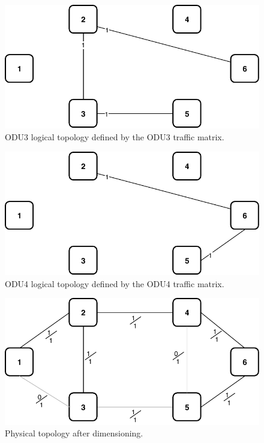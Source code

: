 \begin{figure}[h!]
\centering
\includegraphics[width=12cm]{sdf/ilp/opaque_survivability/figures/logical_topology_ODU3_low}
\caption{ODU3 logical topology defined by the ODU3 traffic matrix.}
\label{logical_ODU3_low}
\end{figure}

\begin{figure}[h!]
\centering
\includegraphics[width=12cm]{sdf/ilp/opaque_survivability/figures/logical_topology_ODU4_low}
\caption{ODU4 logical topology defined by the ODU4 traffic matrix.}
\label{logical_ODU4_low}
\end{figure}

\begin{figure}[h!]
\centering
\includegraphics[width=12cm]{sdf/ilp/opaque_survivability/figures/physical_topology_low}
\caption{Physical topology after dimensioning.}
\label{physical_low}
\end{figure}

